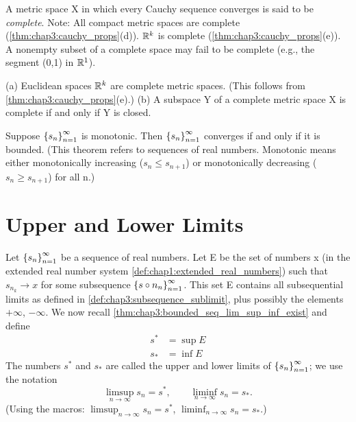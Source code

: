 \begin{definition} %
  \label{def:chap3:complete_metric_space}
  A metric space X in which every Cauchy sequence converges is said
  to be \emph{complete}.
  Note: All compact metric spaces are complete
  (\autoref{thm:chap3:cauchy_props}(d)). $\mathbb{R}^k$ is complete
  (\autoref{thm:chap3:cauchy_props}(e)). A nonempty subset of a
  complete space may fail to be complete (e.g., the segment (0,1) in $\mathbb{R}^1$).
\end{definition}



\begin{theorem} %
  \label{thm:chap3:completeness_Rk}
  (a) Euclidean spaces $\mathbb{R}^k$ are complete metric spaces. (This
  follows from \autoref{thm:chap3:cauchy_props}(e).)
  (b) A subspace Y of a complete metric space X is complete if and
  only if Y is closed.
\end{theorem}

\begin{theorem} %
  \label{thm:chap3:monotonic_sequences}
  Suppose $\left\{ s_n \right\}_{n=1}^\infty$ is monotonic. Then $\left\{ s_n \right\}_{n=1}^\infty$ converges
  if and only if it is bounded.
  (This theorem refers to sequences of real numbers. Monotonic means
    either monotonically increasing ($s_n \le s_{n+1}$) or
  monotonically decreasing ($s_n \ge s_{n+1}$) for all n.)
\end{theorem}

\section{Upper and Lower Limits}
\label{sec:chap3:lim_sup_inf}

\begin{definition} %
  \label{def:chap3:lim_sup_inf}
  Let $\left\{ s_n \right\}_{n=1}^\infty$ be a sequence of real numbers. Let E be the set
  of numbers x (in the extended real number system
  \autoref{def:chap1:extended_real_numbers}) such that $s_{n_k} \to
  x$ for some subsequence $\left\{ s \circ n_n \right\}_{n=1}^\infty$. This set E contains
  all subsequential limits as defined in
  \autoref{def:chap3:subsequence_sublimit}, plus possibly the
  elements $+\infty$, $-\infty$.
  We now recall \autoref{thm:chap3:bounded_seq_lim_sup_inf_exist} and define
  \begin{align*}
    s^* &= \sup E \\
    s_* &= \inf E
  \end{align*}
  The numbers $s^*$ and $s_*$ are called the upper and lower limits
  of $\left\{ s_n \right\}_{n=1}^\infty$; we use the notation
  \[ \limsup_{n \to \infty} s_n = s^*, \qquad \liminf_{n \to \infty}
  s_n = s_*. \]
  (Using the macros: $\limsup_{n \to \infty} s_n = s^*$, $\liminf_{n
  \to \infty} s_n = s_*$.)
\end{definition}

